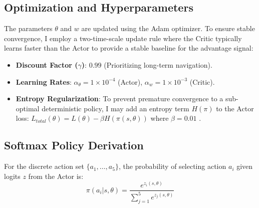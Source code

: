 \documentclass[12pt]{article}
\begin{document}
	\subsection{Optimization and Hyperparameters}
	The parameters $\theta$ and $w$ are updated using the Adam optimizer. To ensure stable convergence, I employ a two-time-scale update rule where the Critic typically learns faster than the Actor to provide a stable baseline for the advantage signal:
	\begin{itemize}
		\item \textbf{Discount Factor ($\gamma$)}: $0.99$ (Prioritizing long-term navigation).
		\item \textbf{Learning Rates}: $\alpha_\theta = 1 \times 10^{-4}$ (Actor), $\alpha_w = 1 \times 10^{-3}$ (Critic).
		\item \textbf{Entropy Regularization}: To prevent premature convergence to a sub-optimal deterministic policy, I may add an entropy term $H(\pi)$ to the Actor loss: $L_{total}(\theta) = L(\theta) - \beta H(\pi(s, \theta))$ where $\beta = 0.01$ .
	\end{itemize}
	
	\subsection{Softmax Policy Derivation}
	For the discrete action set $\{a_1, \dots, a_5\}$, the probability of selecting action $a_i$ given logits $z$ from the Actor is:
	$$ \pi(a_i | s, \theta) = \frac{e^{z_i(s, \theta)}}{\sum_{j=1}^5 e^{z_j(s, \theta)}} $$
	
\end{document}
